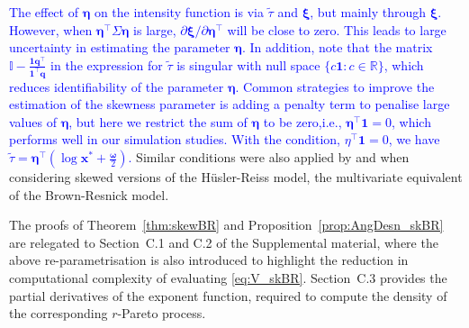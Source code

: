 \documentclass[12pt]{article}
\newcommand{\PZ}{\textcolor{blue}}
\begin{document}
\PZ{The effect of $\bm\eta$ on the intensity function is via $\tilde\tau$ and $\bm\xi$, but mainly through $\bm\xi$. However, when $\bm\eta^\top\Sigma\bm\eta$ is large, $\partial\bm\xi/\partial\bm\eta^\top$ will be close to zero. This leads to large uncertainty in estimating the parameter $\bm\eta$. In addition, note that the matrix $\mathbb{I} - \frac{\bm 1\bm q^\top}{\bm 1^\top \bm q}$ in the expression for $\tilde\tau$ is singular with null space $\{c\bm 1:c\in\mathbb R\}$, which reduces identifiability of the parameter $\bm \eta$. Common strategies to improve the estimation of the skewness parameter is adding a penalty term to penalise large values of $\bm\eta$, but here we restrict the sum of $\bm\eta$ to be zero,i.e., $\bm\eta^\top\bm 1 = 0$, which performs well in our simulation studies. With the condition, $\eta^\top\bm 1 = 0$, we have $\tilde\tau = \bm\eta^\top(\log \bm x^* + \frac{{\bm\omega}}{2})$.}   
Similar conditions were also applied by \citet{Padoan:2011} and \citet{Beranger.etal:2019} when considering skewed versions of the H\"{u}sler-Reiss model, the multivariate equivalent of the Brown-Resnick model. 

The proofs of Theorem~\ref{thm:skewBR} and Proposition~\ref{prop:AngDesn_skBR} are relegated to Section~C.1 and C.2 of the Supplemental material, where the above re-parametrisation is also introduced to highlight the reduction in computational complexity of evaluating \eqref{eq:V_skBR}. Section~C.3 provides the partial derivatives of the exponent function, required to compute the density of the corresponding $r$-Pareto process. 

\end{document}

